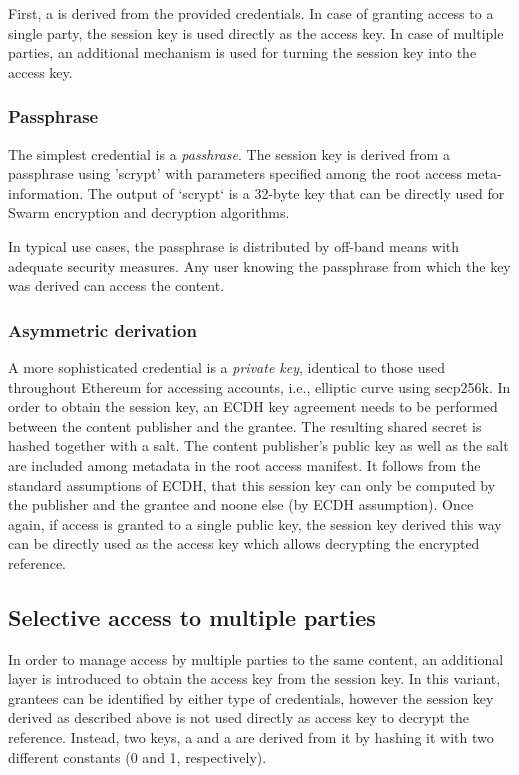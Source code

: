 First, a  is derived from the provided credentials. In case of granting access to a single party, the session key is used directly as the access key. In case of multiple parties, an additional mechanism is used for turning the session key into the access key.

\subsubsection{Passphrase}
The simplest credential is a \emph{passhrase}. The session key is derived from a passphrase using 'scrypt' with parameters specified among the root access meta-information. The output of `scrypt` is a 32-byte key that can be directly used for Swarm encryption and decryption algorithms.

In typical use cases, the passphrase is distributed by off-band means with adequate security measures. Any user knowing the passphrase from which the key was derived can access the content.

\subsubsection{Asymmetric derivation}

A more sophisticated credential is a \emph{private key}, identical to those used throughout Ethereum for accessing accounts, i.e., elliptic curve using secp256k. In order to obtain the session key, an ECDH key agreement needs to be performed between the content publisher and the grantee. The resulting shared secret is hashed together with a salt. The content publisher's public key as well as the salt are included among metadata in the root access manifest. It follows from the standard assumptions of ECDH, that this session key can only be computed by the publisher and the grantee and noone else (by ECDH assumption). 
Once again, if access is granted to a single public key, the session key derived this way can be directly used as the access key which allows decrypting the encrypted reference. 

\subsection{Selective access to multiple parties}

In order to manage access by multiple parties to the same content, an additional layer is introduced to obtain the access key from the session key. In this variant, grantees can be identified by either type of credentials, however the session key derived as
described above is not used directly as access key to decrypt the reference. Instead, two keys, a  and a  are derived from it by hashing it with two different constants (0 and 1, respectively).

